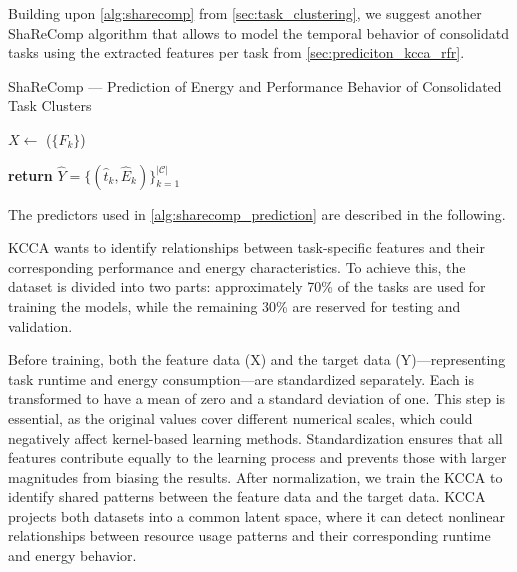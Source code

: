 Building upon \ref{alg:sharecomp} from \ref{sec:task_clustering}, we suggest another ShaReComp algorithm that allows to model the temporal behavior of consolidatd tasks using the extracted features per task from \ref{sec:prediciton_kcca_rfr}.

\begin{algorithm}[H]
    \caption{ShaReComp — Prediction of Energy and Performance Behavior of Consolidated Task Clusters}
    \label{alg:sharecomp_prediction}


    \BlankLine
    $X \gets$ \Build($\{F_k\}$) 

    \BlankLine
    \BlankLine
    \textbf{return } $\hat{Y} = \{ (\hat{t}_k, \hat{E}_k) \}_{k=1}^{|\mathcal{C}|}$
\end{algorithm}

The predictors used in \ref{alg:sharecomp_prediction} are described in the following.

KCCA wants to identify relationships between task-specific features and their corresponding performance and energy characteristics. To achieve this, the dataset is divided into two parts: approximately 70\% of the tasks are used for training the models, while the remaining 30\% are reserved for testing and validation.

Before training, both the feature data (X) and the target data (Y)—representing task runtime and energy consumption—are standardized separately. Each is transformed to have a mean of zero and a standard deviation of one. This step is essential, as the original values cover different numerical scales, which could negatively affect kernel-based learning methods. Standardization ensures that all features contribute equally to the learning process and prevents those with larger magnitudes from biasing the results.
After normalization, we train the KCCA to identify shared patterns between the feature data and the target data. KCCA projects both datasets into a common latent space, where it can detect nonlinear relationships between resource usage patterns and their corresponding runtime and energy behavior.

